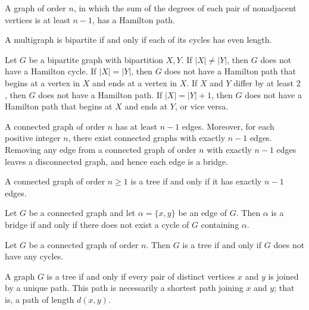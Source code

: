 \begin{theorem}
  \label{thm:11.3.4}
  A graph of order $n$, in which the sum of the degrees of each pair of nonadjacent vertices is at 
  least $n - 1$, has a Hamilton path.
\end{theorem}

\begin{theorem}
  \label{thm:11.4.1}
  A multigraph is bipartite if and only if each of its cycles has even length.
\end{theorem}

\begin{theorem}
  \label{thm:11.4.2}
  Let $G$ be a bipartite graph with bipartition $X, Y$. If $|X| \neq|Y|$, then $G$ does not have a 
  Hamilton cycle. If $|X|=|Y|$, then $G$ does not have a Hamilton path that begins at a vertex in 
  $X$ and ends at a vertex in $X$. If $X$ and $Y$ differ by at least 2 , then $G$ does not have a 
  Hamilton path. If $|X|=|Y|+1$, then $G$ does not have a Hamilton path that begins at $X$ and ends 
  at $Y$, or vice versa.
\end{theorem}

\begin{theorem}
  \label{thm:11.5.1}
  A connected graph of order $n$ has at least $n - 1$ edges. Moreover, for each positive integer $n$, 
  there exist connected graphs with exactly $n - 1$ edges. Removing any edge from a connected graph 
  of order $n$ with exactly $n-1$ edges leaves a disconnected graph, and hence each edge is a bridge.
\end{theorem}

\begin{theorem}
  \label{thm:11.5.2}
  A connected graph of order $n \geq 1$ is a tree if and only if it has exactly $n - 1$ edges.
\end{theorem}

\begin{theorem}
  \label{thm:11.5.3}
  Let $G$ be a connected graph and let $\alpha = \{x,y\}$ be an edge of $G$. Then $\alpha$ is a 
  bridge if and only if there does not exist a cycle of $G$ containing $\alpha$.
\end{theorem}

\begin{theorem}
  \label{thm:11.5.4}
  Let $G$ be a connected graph of order $n$. Then $G$ is a tree if and only if $G$ does not have 
  any cycles.
\end{theorem}

\begin{theorem}
  \label{thm:11.5.5}
  A graph $G$ is a tree if and only if every pair of distinct vertices $x$ and $y$ is joined by a unique path. This path is necessarily a shortest path joining $x$ and $y$; that is, a path of 
  length $d(x, y)$.
\end{theorem}

